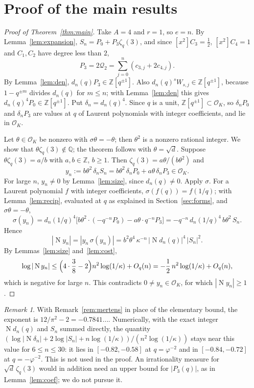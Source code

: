 \documentclass[11pt]{amsart}
\theoremstyle{definition}
\theoremstyle{remark}
\newtheorem{remark}[theorem]{Remark}
\numberwithin{equation}{section}
\newcommand{\ZZ}{\mathbb{Z}}
\newcommand{\QQ}{\mathbb{Q}}
\newcommand{\cO}{\mathcal{O}}
\newcommand{\Nm}{\operatorname{N}}
\begin{document}
\section{Proof of the main results}\label{sec:proof}

\begin{proof}[Proof of Theorem~\ref{thm:main}]
Take $A=4$ and $r=1$, so $e=n$. By Lemma~\ref{lem:expansion}, $S_n=P_0+P_3\zeta_q(3)$, and since $[x^2]C_3=\frac12$,
$[x^2]C_4=1$ and $C_1,C_2$ have degree less than $2$,
\[
P_3=2\mathcal Q_2=\sum_{j=0}^n(c_{3,j}+2c_{4,j}).
\]
By Lemma~\ref{lem:den}, $d_n(q)P_3\in\ZZ[q^{\pm1}]$. Also $d_n(q)^sW_{s,j}\in\ZZ[q^{\pm1}]$, because $1-q^{\pm m}$
divides $d_n(q)$ for $m\le n$; with Lemma~\ref{lem:den} this gives $d_n(q)^4P_0\in\ZZ[q^{\pm1}]$. Put
$\delta_n=d_n(q)^4$. Since $q$ is a unit, $\ZZ[q^{\pm1}]\subset\cO_K$, so $\delta_nP_0$ and $\delta_nP_3$ are
values at $q$ of Laurent polynomials with integer coefficients, and lie in $\cO_K$.

Let $\theta\in\cO_K$ be nonzero with $\sigma\theta=-\theta$; then $\theta^2$ is a nonzero rational integer. We show
that $\theta\zeta_q(3)\notin\QQ$; the theorem follows with $\theta=\sqrt d$. Suppose $\theta\zeta_q(3)=a/b$ with
$a,b\in\ZZ$, $b\ge1$. Then $\zeta_q(3)=a\theta/(b\theta^2)$ and
\[
y_n:=b\theta^2\,\delta_nS_n=b\theta^2\,\delta_nP_0+a\theta\,\delta_nP_3\in\cO_K.
\]
For large $n$, $y_n\ne0$ by Lemma~\ref{lem:size}, since $d_n(q)\ne0$. Apply $\sigma$. For a Laurent polynomial $f$ with
integer coefficients, $\sigma(f(q))=f(1/q)$; with Lemma~\ref{lem:recip}, evaluated at $q$ as explained in
Section~\ref{sec:forms}, and $\sigma\theta=-\theta$,
\[
\sigma(y_n)=d_n(1/q)^4\bigl[b\theta^2\cdot(-q^{-n}P_0)-a\theta\cdot q^{-n}P_3\bigr]=-q^{-n}\,d_n(1/q)^4\,b\theta^2\,S_n.
\]
Hence
\[
|\Nm y_n|=|y_n\,\sigma(y_n)|=b^2\theta^4\,\kappa^{-n}\,|\Nm d_n(q)|^4\,|S_n|^2.
\]
By Lemmas~\ref{lem:size} and~\ref{lem:cost},
\[
\log|\Nm y_n|\le\Bigl(4\cdot\frac38-2\Bigr)n^2\log(1/\kappa)+O_q(n)=-\frac12\,n^2\log(1/\kappa)+O_q(n),
\]
which is negative for large $n$. This contradicts $0\ne y_n\in\cO_K$, for which $|\Nm y_n|\ge1$.
\end{proof}

\begin{remark}
With Remark~\ref{rem:mertens} in place of the elementary bound, the exponent is $12/\pi^2-2=-0.7841\ldots$. Numerically,
with the exact integer $\Nm d_n(q)$ and $S_n$ summed directly, the quantity
$(\log|\Nm\delta_n|+2\log|S_n|+n\log(1/\kappa))/(n^2\log(1/\kappa))$ stays near this value for
$6\le n\le30$: it lies in $[-0.82,-0.58]$ at $q=\varphi^{-2}$ and in $[-0.84,-0.72]$ at $q=-\varphi^{-2}$. This is not
used in the proof. An irrationality measure for $\sqrt d\,\zeta_q(3)$ would in addition need an upper bound for
$|P_3(q)|$, as in Lemma~\ref{lem:coef}; we do not pursue it.
\end{remark}
\end{document}
